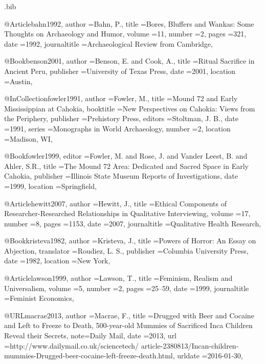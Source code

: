 \begin{filecontents}{\IJSRAidentifier.bib}

@Article{bahn1992,
	author       ={Bahn, P.},
	title        ={Bores, Bluffers and Wankas: Some Thoughts on Archaeology and Humor},
	volume       ={11},
	number       ={2},
	pages        ={321},
	date         ={1992},
	journaltitle ={Archaeological Review from Cambridge},
}

@Book{benson2001,
	author       ={Benson, E. and Cook, A.},
	title        ={Ritual Sacrifice in Ancient Peru},
	publisher    ={University of Texas Press},
	date         ={2001},
	location     ={Austin},
}

@InCollection{fowler1991,
	author       ={Fowler, M.},
	title        ={Mound 72 and Early Mississippian at Cahokia},
	booktitle    ={New Perspectives on Cahokia: Views from the Periphery},
	publisher    ={Prehistory Press},
	editors      ={Stoltman, J. B.},
	date         ={1991},
	series       ={Monographs in World Archaeology}, 
	number       ={2},
	location     ={Madison, WI},
}​

@Book{fowler1999,
	editor       ={Fowler, M. and Rose, J. and {Vander} Leest, B. and Ahler, S.R.},
	title        ={The Mound 72 Area: Dedicated and Sacred Space in Early Cahokia},
	publisher    ={Illinois State Museum Reports of Investigations},
	date         ={1999},
	location     ={Springfield},
}

@Article{hewitt2007,
	author       ={Hewitt, J.},
	title        ={Ethical Components of Researcher-Researched Relationships in Qualitative Interviewing},
	volume       ={17},
	number       ={8},
	pages        ={1153},
	date         ={2007},
	journaltitle ={Qualitative Health Research},
}

@Book{kristeva1982,
	author       ={Kristeva, J.},
	title        ={Powers of Horror: An Essay on Abjection},
	translator   ={Roudiez, L. S.},
	publisher    ={Columbia University Press},
	date         ={1982},
	location     ={New York},
}

@Article{lawson1999,
	author       ={Lawson, T.},
	title        ={Feminism, Realism and Universalism},
	volume       ={5},
	number       ={2},
	pages        ={25--59},
	date         ={1999},
	journaltitle ={Feminist Economics},
}

@URL{macrae2013,
	author   ={Macrae, F.},
	title    ={Drugged with Beer and Cocaine and Left to Freeze to Death, 500-year-old Mummies of Sacrificed Inca Children Reveal their Secrets},
	note={Daily Mail},
	date     ={2013},
	url      ={http://www.dailymail.co.uk/sciencetech/ article-2380813/Incan-children-mummies-Drugged-beer-cocaine-left-freeze-death.html},
	urldate  ={2016-01-30},
}


\end{filecontents}
